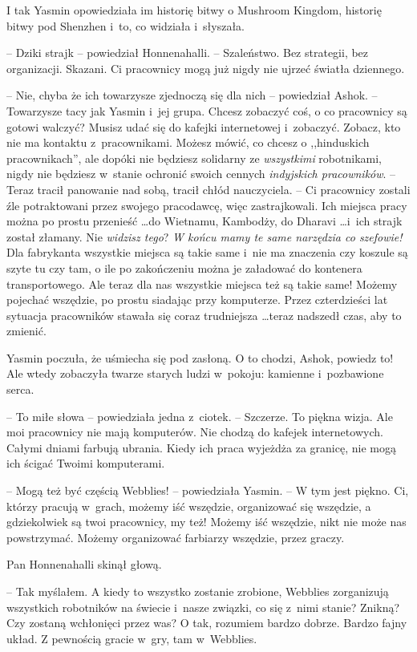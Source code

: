 \documentclass[oneside,polish,11pt,rmheadings]{mwbk}
\begin{document}
I tak Yasmin opowiedziała im historię bitwy o Mushroom Kingdom, historię bitwy pod Shenzhen i~to, co widziała i~słyszała.

-- Dziki strajk -- powiedział Honnenahalli. -- Szaleństwo. Bez strategii, bez organizacji. Skazani. Ci pracownicy mogą już nigdy nie ujrzeć światła dziennego.

-- Nie, chyba że ich towarzysze zjednoczą się dla nich -- powiedział Ashok. -- Towarzysze tacy jak Yasmin i~jej grupa. Chcesz zobaczyć coś, o co pracownicy są gotowi walczyć? Musisz udać się do kafejki internetowej i~zobaczyć. Zobacz, kto nie ma kontaktu z~pracownikami. Możesz mówić, co chcesz o ,,hinduskich pracownikach'', ale dopóki nie będziesz solidarny ze \textit{wszystkimi }robotnikami, nigdy nie będziesz w~stanie ochronić swoich cennych \textit{indyjskich pracowników}. -- Teraz tracił panowanie nad sobą, tracił chłód nauczyciela. -- Ci pracownicy zostali źle potraktowani przez swojego pracodawcę, więc zastrajkowali. Ich miejsca pracy można po prostu przenieść  \ldots  do Wietnamu, Kambodży, do Dharavi  \ldots  i~ich strajk został złamany. Nie \textit{widzisz tego}? \textit{W końcu mamy te same narzędzia co szefowie!} Dla fabrykanta wszystkie miejsca są takie same i~nie ma znaczenia czy koszule są szyte tu czy tam, o ile po zakończeniu można je załadować do kontenera transportowego. Ale teraz dla nas wszystkie miejsca też są takie same! Możemy pojechać wszędzie, po prostu siadając przy komputerze. Przez czterdzieści lat sytuacja pracowników stawała się coraz trudniejsza  \ldots  teraz nadszedł czas, aby to zmienić.

Yasmin poczuła, że uśmiecha się pod zasłoną. O to chodzi, Ashok, powiedz to! Ale wtedy zobaczyła twarze starych ludzi w~pokoju: kamienne i~pozbawione serca.

-- To miłe słowa -- powiedziała jedna z~ciotek. -- Szczerze. To piękna wizja. Ale moi pracownicy nie mają komputerów. Nie chodzą do kafejek internetowych. Całymi dniami farbują ubrania. Kiedy ich praca wyjeżdża za granicę, nie mogą ich ścigać Twoimi komputerami.

-- Mogą też być częścią Webblies! -- powiedziała Yasmin. -- W tym jest piękno. Ci, którzy pracują w~grach, możemy iść wszędzie, organizować się wszędzie, a gdziekolwiek są twoi pracownicy, my też! Możemy iść wszędzie, nikt nie może nas powstrzymać. Możemy organizować farbiarzy wszędzie, przez graczy.

Pan Honnenahalli skinął głową. 

-- Tak myślałem. A kiedy to wszystko zostanie zrobione, Webblies zorganizują wszystkich robotników na świecie i~nasze związki, co się z~nimi stanie? Znikną? Czy zostaną wchłonięci przez was? O tak, rozumiem bardzo dobrze. Bardzo fajny układ. Z pewnością gracie w~gry, tam w~Webblies.
\end{document}
